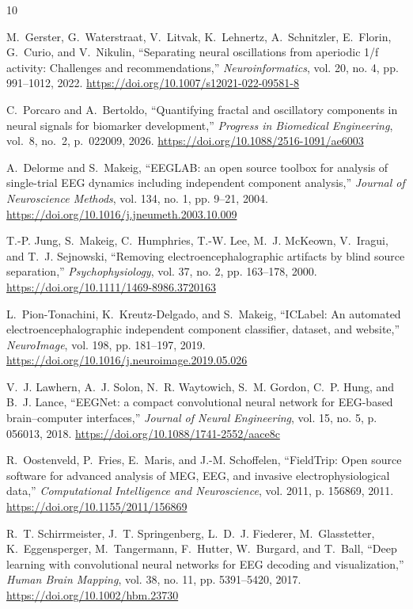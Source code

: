 \documentclass[preprint,12pt]{elsarticle}
\begin{document}
\begin{thebibliography}{10}

M.~Gerster, G.~Waterstraat, V.~Litvak, K.~Lehnertz, A.~Schnitzler, E.~Florin, G.~Curio, and V.~Nikulin, ``Separating neural oscillations from aperiodic 1/f activity: Challenges and recommendations,'' \emph{Neuroinformatics}, vol. 20, no. 4, pp. 991--1012, 2022. \url{https://doi.org/10.1007/s12021-022-09581-8}

C.~Porcaro and A.~Bertoldo, ``Quantifying fractal and oscillatory components in neural signals for biomarker development,'' \emph{Progress in Biomedical Engineering}, vol.~8, no.~2, p.~022009, 2026. \url{https://doi.org/10.1088/2516-1091/ae6003}

A.~Delorme and S.~Makeig, ``EEGLAB: an open source toolbox for analysis of single-trial EEG dynamics including independent component analysis,'' \emph{Journal of Neuroscience Methods}, vol. 134, no. 1, pp. 9--21, 2004. \url{https://doi.org/10.1016/j.jneumeth.2003.10.009}

T.-P. Jung, S.~Makeig, C.~Humphries, T.-W. Lee, M.~J. McKeown, V.~Iragui, and T.~J. Sejnowski, ``Removing electroencephalographic artifacts by blind source separation,'' \emph{Psychophysiology}, vol. 37, no. 2, pp. 163--178, 2000. \url{https://doi.org/10.1111/1469-8986.3720163}

L.~Pion-Tonachini, K.~Kreutz-Delgado, and S.~Makeig, ``ICLabel: An automated electroencephalographic independent component classifier, dataset, and website,'' \emph{NeuroImage}, vol. 198, pp. 181--197, 2019. \url{https://doi.org/10.1016/j.neuroimage.2019.05.026}

V.~J. Lawhern, A.~J. Solon, N.~R. Waytowich, S.~M. Gordon, C.~P. Hung, and B.~J. Lance, ``EEGNet: a compact convolutional neural network for EEG-based brain--computer interfaces,'' \emph{Journal of Neural Engineering}, vol. 15, no. 5, p. 056013, 2018. \url{https://doi.org/10.1088/1741-2552/aace8c}

R.~Oostenveld, P.~Fries, E.~Maris, and J.-M. Schoffelen, ``FieldTrip: Open source software for advanced analysis of MEG, EEG, and invasive electrophysiological data,'' \emph{Computational Intelligence and Neuroscience}, vol. 2011, p. 156869, 2011. \url{https://doi.org/10.1155/2011/156869}

R.~T. Schirrmeister, J.~T. Springenberg, L.~D.~J. Fiederer, M.~Glasstetter, K.~Eggensperger, M.~Tangermann, F.~Hutter, W.~Burgard, and T.~Ball, ``Deep learning with convolutional neural networks for EEG decoding and visualization,'' \emph{Human Brain Mapping}, vol. 38, no. 11, pp. 5391--5420, 2017. \url{https://doi.org/10.1002/hbm.23730}


\end{thebibliography}
\end{document}
